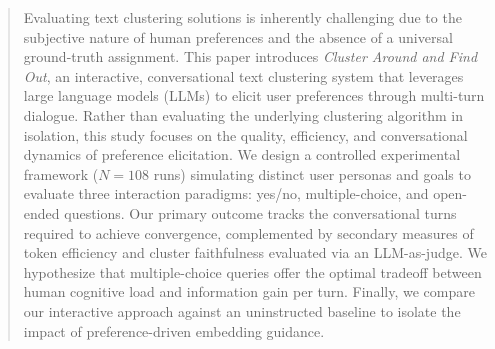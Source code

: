 \begin{abstract}
Evaluating text clustering solutions is inherently challenging due to the subjective nature of human preferences and the absence of a universal ground-truth assignment.
This paper introduces \textit{Cluster Around and Find Out}, an interactive, conversational text clustering system that leverages large language models (LLMs) to elicit user preferences through multi-turn dialogue.
Rather than evaluating the underlying clustering algorithm in isolation, this study focuses on the quality, efficiency, and conversational dynamics of preference elicitation.
We design a controlled experimental framework ($N=108$ runs) simulating distinct user personas and goals to evaluate three interaction paradigms: yes/no, multiple-choice, and open-ended questions. 
Our primary outcome tracks the conversational turns required to achieve convergence, complemented by secondary measures of token efficiency and cluster faithfulness evaluated via an LLM-as-judge. 
We hypothesize that multiple-choice queries offer the optimal tradeoff between human cognitive load and information gain per turn. 
Finally, we compare our interactive approach against an uninstructed baseline to isolate the impact of preference-driven embedding guidance.
\end{abstract}